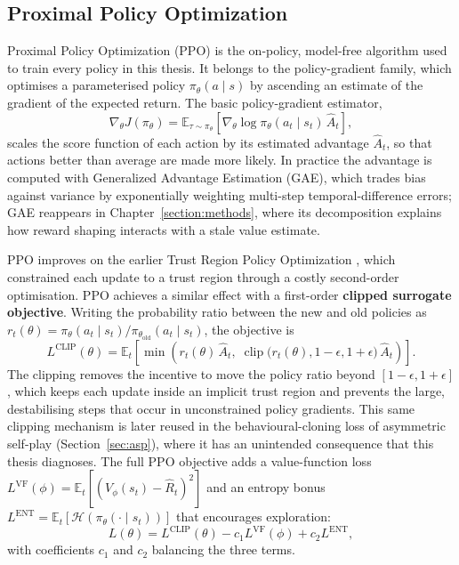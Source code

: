 \subsection{Proximal Policy Optimization}
\label{sec:ppo}

Proximal Policy Optimization (PPO) \cite{Schulman2017ProximalPO} is the on-policy,
model-free algorithm used to train every policy in this thesis. It belongs to the
policy-gradient family, which optimises a parameterised policy $\pi_{\theta}(a
\mid s)$ by ascending an estimate of the gradient of the expected return. The
basic policy-gradient estimator,
\begin{equation}
    \nabla_{\theta} J(\pi_{\theta}) = \mathbb{E}_{\tau \sim \pi_{\theta}}\!\left[ \nabla_{\theta} \log \pi_{\theta}(a_t \mid s_t)\, \hat{A}_t \right],
\end{equation}
scales the score function of each action by its estimated advantage $\hat{A}_t$,
so that actions better than average are made more likely. In practice the
advantage is computed with Generalized Advantage Estimation (GAE), which trades
bias against variance by exponentially weighting multi-step temporal-difference
errors; GAE reappears in Chapter~\ref{section:methods}, where its decomposition
explains how reward shaping interacts with a stale value estimate.

PPO improves on the earlier Trust Region Policy Optimization
\cite{Schulman2015TrustRP}, which constrained each update to a trust region
through a costly second-order optimisation. PPO achieves a similar effect with a
first-order \textbf{clipped surrogate objective}. Writing the probability ratio
between the new and old policies as $r_t(\theta) = \pi_{\theta}(a_t \mid s_t) /
\pi_{\theta_{\text{old}}}(a_t \mid s_t)$, the objective is
\begin{equation}
    L^{\text{CLIP}}(\theta) = \mathbb{E}_t\!\left[ \min\!\left( r_t(\theta)\, \hat{A}_t,\; \operatorname{clip}\!\big(r_t(\theta), 1 - \epsilon, 1 + \epsilon\big)\, \hat{A}_t \right) \right].
    \label{eq:ppo_clip}
\end{equation}
The clipping removes the incentive to move the policy ratio beyond $[1 - \epsilon,
1 + \epsilon]$, which keeps each update inside an implicit trust region and
prevents the large, destabilising steps that occur in unconstrained policy
gradients. This same clipping mechanism is later reused in the behavioural-cloning
loss of asymmetric self-play (Section~\ref{sec:asp}), where it has an unintended
consequence that this thesis diagnoses. The full PPO objective adds a value-function
loss $L^{\text{VF}}(\phi) = \mathbb{E}_t[(V_{\phi}(s_t) - \hat{R}_t)^2]$ and an
entropy bonus $L^{\text{ENT}} = \mathbb{E}_t[\mathcal{H}(\pi_{\theta}(\cdot \mid
s_t))]$ that encourages exploration:
\begin{equation}
    L(\theta) = L^{\text{CLIP}}(\theta) - c_1 L^{\text{VF}}(\phi) + c_2 L^{\text{ENT}},
\end{equation}
with coefficients $c_1$ and $c_2$ balancing the three terms.


